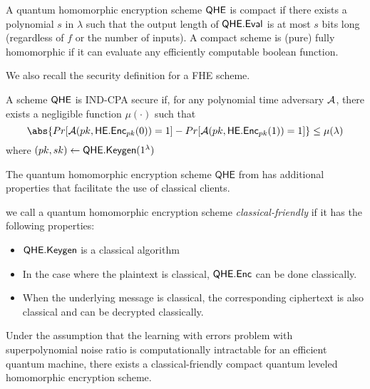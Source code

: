\begin{definition}
	A quantum homomorphic encryption scheme $\mathsf{QHE}$ is compact if
	there exists a polynomial $s$ in $\lambda$ such that the output length of $\mathsf{QHE.Eval}$ is at most $s$ bits long (regardless of $f$ or
	the number of inputs). A compact scheme is (pure) fully homomorphic if it can evaluate any efficiently computable
	boolean function.
\end{definition}

We also recall the security definition for a FHE scheme.

\begin{definition}
	A scheme $\mathsf{QHE}$ is IND-CPA secure if, for any polynomial time adversary $\mathcal{A}$, there exists a negligible function $\mu(\cdot)$ such that
	$$\abs{Pr[\cA(pk, \mathsf{HE.Enc}_{pk}(0))=1]-Pr[\cA(pk, \mathsf{HE.Enc}_{pk}(1))=1]}\leq\mu(\lambda)$$
	where $(pk, sk)\leftarrow\mathsf{QHE.Keygen}(1^\lambda)$
\end{definition}

The quantum homomorphic encryption scheme $\mathsf{QHE}$ from \cite{mahadev_qfhe} has additional properties that facilitate the use of classical clients.

\begin{definition}
	we call a quantum homomorphic encryption scheme \emph{classical-friendly} if it has the following properties:
	\begin{itemize}
		\item $\mathsf{QHE.Keygen}$ is a classical algorithm
		\item In the case where the plaintext is classical, $\mathsf{QHE.Enc}$ can be done classically.
		\item When the underlying message is classical, the corresponding ciphertext is also classical and can be decrypted classically.
	\end{itemize}
\end{definition}

\begin{theorem} 
	Under the assumption that the learning with errors problem with superpolynomial noise ratio is computationally intractable for an efficient quantum machine,
	there exists a classical-friendly compact quantum leveled homomorphic encryption scheme.
\end{theorem}
